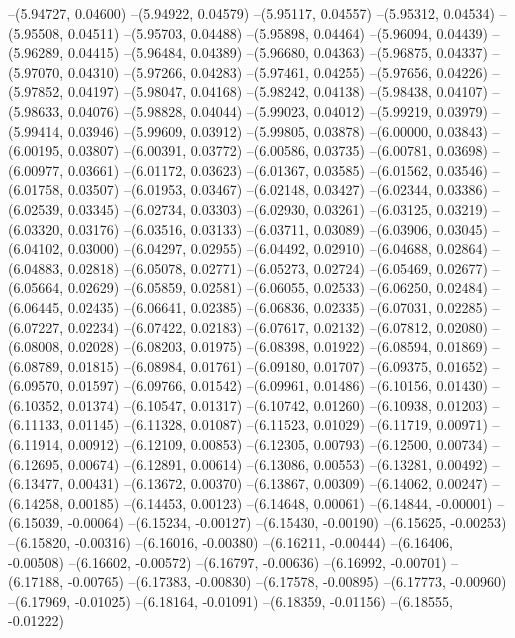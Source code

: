 --(5.94727, 0.04600)
--(5.94922, 0.04579)
--(5.95117, 0.04557)
--(5.95312, 0.04534)
--(5.95508, 0.04511)
--(5.95703, 0.04488)
--(5.95898, 0.04464)
--(5.96094, 0.04439)
--(5.96289, 0.04415)
--(5.96484, 0.04389)
--(5.96680, 0.04363)
--(5.96875, 0.04337)
--(5.97070, 0.04310)
--(5.97266, 0.04283)
--(5.97461, 0.04255)
--(5.97656, 0.04226)
--(5.97852, 0.04197)
--(5.98047, 0.04168)
--(5.98242, 0.04138)
--(5.98438, 0.04107)
--(5.98633, 0.04076)
--(5.98828, 0.04044)
--(5.99023, 0.04012)
--(5.99219, 0.03979)
--(5.99414, 0.03946)
--(5.99609, 0.03912)
--(5.99805, 0.03878)
--(6.00000, 0.03843)
--(6.00195, 0.03807)
--(6.00391, 0.03772)
--(6.00586, 0.03735)
--(6.00781, 0.03698)
--(6.00977, 0.03661)
--(6.01172, 0.03623)
--(6.01367, 0.03585)
--(6.01562, 0.03546)
--(6.01758, 0.03507)
--(6.01953, 0.03467)
--(6.02148, 0.03427)
--(6.02344, 0.03386)
--(6.02539, 0.03345)
--(6.02734, 0.03303)
--(6.02930, 0.03261)
--(6.03125, 0.03219)
--(6.03320, 0.03176)
--(6.03516, 0.03133)
--(6.03711, 0.03089)
--(6.03906, 0.03045)
--(6.04102, 0.03000)
--(6.04297, 0.02955)
--(6.04492, 0.02910)
--(6.04688, 0.02864)
--(6.04883, 0.02818)
--(6.05078, 0.02771)
--(6.05273, 0.02724)
--(6.05469, 0.02677)
--(6.05664, 0.02629)
--(6.05859, 0.02581)
--(6.06055, 0.02533)
--(6.06250, 0.02484)
--(6.06445, 0.02435)
--(6.06641, 0.02385)
--(6.06836, 0.02335)
--(6.07031, 0.02285)
--(6.07227, 0.02234)
--(6.07422, 0.02183)
--(6.07617, 0.02132)
--(6.07812, 0.02080)
--(6.08008, 0.02028)
--(6.08203, 0.01975)
--(6.08398, 0.01922)
--(6.08594, 0.01869)
--(6.08789, 0.01815)
--(6.08984, 0.01761)
--(6.09180, 0.01707)
--(6.09375, 0.01652)
--(6.09570, 0.01597)
--(6.09766, 0.01542)
--(6.09961, 0.01486)
--(6.10156, 0.01430)
--(6.10352, 0.01374)
--(6.10547, 0.01317)
--(6.10742, 0.01260)
--(6.10938, 0.01203)
--(6.11133, 0.01145)
--(6.11328, 0.01087)
--(6.11523, 0.01029)
--(6.11719, 0.00971)
--(6.11914, 0.00912)
--(6.12109, 0.00853)
--(6.12305, 0.00793)
--(6.12500, 0.00734)
--(6.12695, 0.00674)
--(6.12891, 0.00614)
--(6.13086, 0.00553)
--(6.13281, 0.00492)
--(6.13477, 0.00431)
--(6.13672, 0.00370)
--(6.13867, 0.00309)
--(6.14062, 0.00247)
--(6.14258, 0.00185)
--(6.14453, 0.00123)
--(6.14648, 0.00061)
--(6.14844, -0.00001)
--(6.15039, -0.00064)
--(6.15234, -0.00127)
--(6.15430, -0.00190)
--(6.15625, -0.00253)
--(6.15820, -0.00316)
--(6.16016, -0.00380)
--(6.16211, -0.00444)
--(6.16406, -0.00508)
--(6.16602, -0.00572)
--(6.16797, -0.00636)
--(6.16992, -0.00701)
--(6.17188, -0.00765)
--(6.17383, -0.00830)
--(6.17578, -0.00895)
--(6.17773, -0.00960)
--(6.17969, -0.01025)
--(6.18164, -0.01091)
--(6.18359, -0.01156)
--(6.18555, -0.01222)
